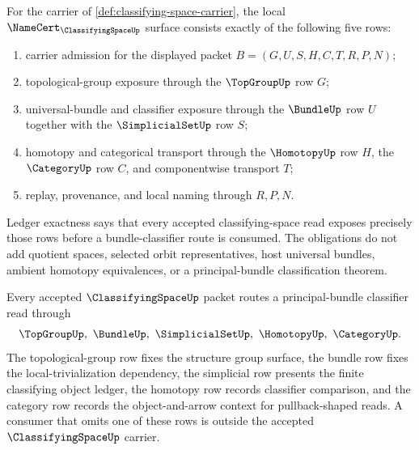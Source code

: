 \begin{theorem}
\label{thm:classifying-space-namecert-obligations}
For the carrier of \autoref{def:classifying-space-carrier}, the local $\NameCert_{\ClassifyingSpaceUp}$ surface consists exactly of the following five rows:
\begin{enumerate}
\item carrier admission for the displayed packet $B=(G,U,S,H,C,T,R,P,N)$;
\item topological-group exposure through the $\TopGroupUp$ row $G$;
\item universal-bundle and classifier exposure through the $\BundleUp$ row $U$ together with the $\SimplicialSetUp$ row $S$;
\item homotopy and categorical transport through the $\HomotopyUp$ row $H$, the $\CategoryUp$ row $C$, and componentwise transport $T$;
\item replay, provenance, and local naming through $R,P,N$.
\end{enumerate}
Ledger exactness says that every accepted classifying-space read exposes precisely those rows before a bundle-classifier route is consumed. The obligations do not add quotient spaces, selected orbit representatives, host universal bundles, ambient homotopy equivalences, or a principal-bundle classification theorem.
\end{theorem}

\begin{theorem}
\label{thm:classifying-space-principal-bundle-route}
Every accepted $\ClassifyingSpaceUp$ packet routes a principal-bundle classifier read through
$$
\TopGroupUp,\ \BundleUp,\ \SimplicialSetUp,\ \HomotopyUp,\ \CategoryUp .
$$
The topological-group row fixes the structure group surface, the bundle row fixes the local-trivialization dependency, the simplicial row presents the finite classifying object ledger, the homotopy row records classifier comparison, and the category row records the object-and-arrow context for pullback-shaped reads. A consumer that omits one of these rows is outside the accepted $\ClassifyingSpaceUp$ carrier.
\end{theorem}


